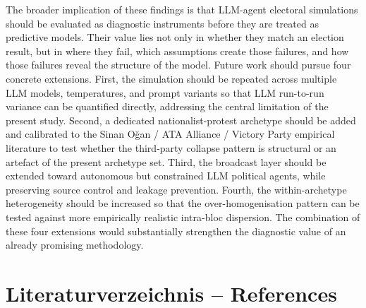 \documentclass[12pt,a4paper]{report}
\begin{document}
The broader implication of these findings is that LLM-agent electoral simulations should be evaluated as diagnostic instruments before they are treated as predictive models. Their value lies not only in whether they match an election result, but in where they fail, which assumptions create those failures, and how those failures reveal the structure of the model. Future work should pursue four concrete extensions. First, the simulation should be repeated across multiple LLM models, temperatures, and prompt variants so that LLM run-to-run variance can be quantified directly, addressing the central limitation of the present study. Second, a dedicated nationalist-protest archetype should be added and calibrated to the Sinan Oğan / ATA Alliance / Victory Party empirical literature to test whether the third-party collapse pattern is structural or an artefact of the present archetype set. Third, the broadcast layer should be extended toward autonomous but constrained LLM political agents, while preserving source control and leakage prevention. Fourth, the within-archetype heterogeneity should be increased so that the over-homogenisation pattern can be tested against more empirically realistic intra-bloc dispersion. The combination of these four extensions would substantially strengthen the diagnostic value of an already promising methodology.

\chapter{Literaturverzeichnis -- References}
\label{ch:references}
\end{document}
